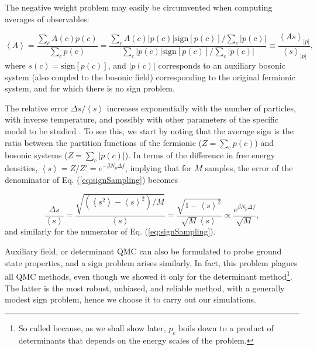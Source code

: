 The negative weight problem may easily be circumvented when computing averages of observables:

\begin{equation}\label{eq:signSampling}
\left\langle A \right\rangle = \frac{\sum_c A ( c ) p ( c )}{\sum_c p ( c ) } = \frac{\sum_c A ( c )|  p ( c ) | \text{sign}[p(c)] / \sum_c | p ( c ) | }{\sum_c  |  p ( c ) | \text{sign}[p(c)] /  \sum_c | p ( c ) |} \equiv \frac{\left\langle A s \right\rangle_{|p|}}{\left\langle s \right\rangle_{|p|}} ,
\end{equation}
where $s(c) = \text{sign} [ p ( c ) ]$, and $| p ( c ) | $ corresponds to an auxiliary bosonic system (also coupled to the bosonic field) corresponding to the original fermionic system, and for which there is no sign problem.

The relative error $\Delta s / \left\langle s \right\rangle$ increases exponentially with the number of particles, with inverse temperature, and possibly with other parameters of the specific model to be studied \cite{troyer_computational_2005, hou_numerical_2009}.
To see this, we start by noting that the average sign is the ratio between the partition functions of the fermionic ($Z = \sum_c p(c)$) and bosonic systems ($Z = \sum_c | p ( c ) |$).
In terms of the difference in free energy densities, $\left\langle s \right\rangle = Z / Z' = e^{-\beta N_p \Delta f}$, implying that for $M$ samples, the error of the denominator of Eq. (\ref{eq:signSampling}) becomes

\begin{equation}
\frac{\Delta s}{\left\langle s \right\rangle} = \frac{\sqrt{(\left\langle s^2 \right\rangle - \left\langle s \right\rangle^2 )/ M }}{\left\langle s \right\rangle} = \frac{ \sqrt{ 1 - \left\langle s \right\rangle^2}  }{\sqrt{M} \left\langle s \right\rangle} \propto \frac{e^{\beta N_p \Delta f}}{\sqrt{M}} ,
\end{equation}
and similarly for the numerator of Eq. (\ref{eq:signSampling}).

Auxiliary field, or determinant \acs{QMC} can also be formulated to probe ground state properties, and a sign problem arises similarly.
In fact, this problem plagues all \acs{QMC} methods, even though we showed it only for the determinant method\footnote{So called because, as we shall show later, $p_c$ boils down to a product of determinants that depends on the energy scales of the problem.}.
The latter is the most robust, unbiased, and reliable method, with a generally modest sign problem, hence we choose it to carry out our simulations.

